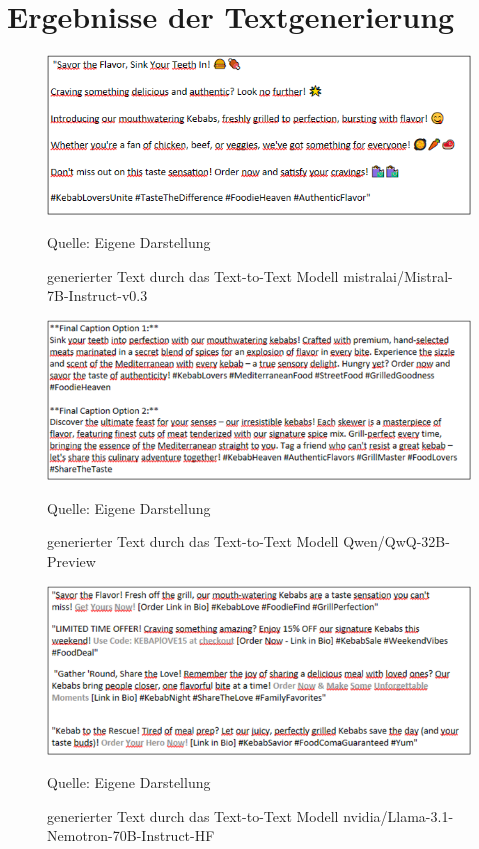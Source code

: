 \section{Ergebnisse der Textgenerierung}\label{sec:bilder-textergebnisse}

\begin{figure}[htbp]
    \centering
    \includegraphics[width=\textwidth]{abbildungen/textresult_mistral}
    \caption[]{generierter Text durch das Text-to-Text Modell mistralai/Mistral-7B-Instruct-v0.3}
    \label{fig:textresult_mistral}
    \raggedright Quelle: Eigene Darstellung
\end{figure}

\begin{figure}[htbp]
    \centering
    \includegraphics[width=\textwidth]{abbildungen/textresult_Qwen}
    \caption[]{generierter Text durch das Text-to-Text Modell Qwen/QwQ-32B-Preview}
    \label{fig:textresult_Qwen}
    \raggedright Quelle: Eigene Darstellung
\end{figure}

\begin{figure}[htbp]
    \centering
    \includegraphics[width=\textwidth]{abbildungen/textresult_nvdia_nemotron}
    \caption[]{generierter Text durch das Text-to-Text Modell nvidia/Llama-3.1-Nemotron-70B-Instruct-HF}
    \label{fig:textresult_nvdia_nemotron}
    \raggedright Quelle: Eigene Darstellung
\end{figure}
\clearpage
